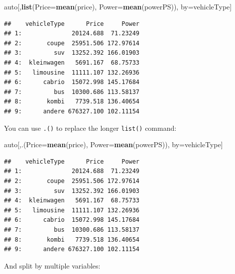 \documentclass[]{book}
\newenvironment{Shaded}{\begin{snugshade}}{\end{snugshade}}
\newcommand{\DataTypeTok}[1]{\textcolor[rgb]{0.13,0.29,0.53}{#1}}
\newcommand{\KeywordTok}[1]{\textcolor[rgb]{0.13,0.29,0.53}{\textbf{#1}}}
\newcommand{\NormalTok}[1]{#1}
\newcommand{\OperatorTok}[1]{\textcolor[rgb]{0.81,0.36,0.00}{\textbf{#1}}}
\newcommand{\StringTok}[1]{\textcolor[rgb]{0.31,0.60,0.02}{#1}}
\theoremstyle{definition}
\theoremstyle{definition}
\theoremstyle{definition}
\theoremstyle{remark}
\begin{document}
\begin{Shaded}
\begin{Highlighting}[]
\NormalTok{auto[,}\KeywordTok{list}\NormalTok{(}\DataTypeTok{Price=}\KeywordTok{mean}\NormalTok{(price), }\DataTypeTok{Power=}\KeywordTok{mean}\NormalTok{(powerPS)), by=vehicleType]}
\end{Highlighting}
\end{Shaded}

\begin{verbatim}
##    vehicleType      Price     Power
## 1:              20124.688  71.23249
## 2:       coupe  25951.506 172.97614
## 3:         suv  13252.392 166.01903
## 4:  kleinwagen   5691.167  68.75733
## 5:   limousine  11111.107 132.26936
## 6:      cabrio  15072.998 145.17684
## 7:         bus  10300.686 113.58137
## 8:       kombi   7739.518 136.40654
## 9:      andere 676327.100 102.11154
\end{verbatim}

You can use \texttt{.()} to replace the longer \texttt{list()} command:

\begin{Shaded}
\begin{Highlighting}[]
\NormalTok{auto[,.(}\DataTypeTok{Price=}\KeywordTok{mean}\NormalTok{(price), }\DataTypeTok{Power=}\KeywordTok{mean}\NormalTok{(powerPS)), by=vehicleType]}
\end{Highlighting}
\end{Shaded}

\begin{verbatim}
##    vehicleType      Price     Power
## 1:              20124.688  71.23249
## 2:       coupe  25951.506 172.97614
## 3:         suv  13252.392 166.01903
## 4:  kleinwagen   5691.167  68.75733
## 5:   limousine  11111.107 132.26936
## 6:      cabrio  15072.998 145.17684
## 7:         bus  10300.686 113.58137
## 8:       kombi   7739.518 136.40654
## 9:      andere 676327.100 102.11154
\end{verbatim}

And split by multiple variables:

\begin{Shaded}
\end{Shaded}
\end{document}
